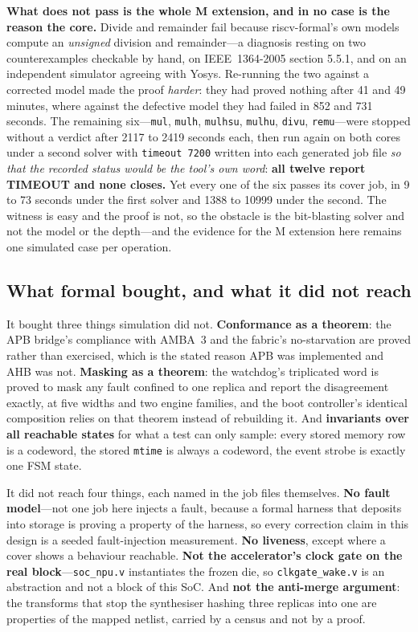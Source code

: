 \documentclass[11pt,a4paper]{article}
\newcommand{\file}[1]{\texttt{\small #1}}
\begin{document}
\textbf{What does not pass is the whole M extension, and in no case is
the reason the core.} Divide and remainder fail because riscv-formal's
own models compute an \emph{unsigned} division and remainder---a
diagnosis resting on two counterexamples checkable by hand, on
IEEE~1364-2005 section 5.5.1, and on an independent simulator agreeing
with Yosys. Re-running the two against a corrected model made the proof
\emph{harder}: they had proved nothing after \num{41} and \num{49}
minutes, where against the defective model they had failed in \num{852}
and \num{731} seconds. The remaining six---\texttt{mul},
\texttt{mulh}, \texttt{mulhsu}, \texttt{mulhu}, \texttt{divu},
\texttt{remu}---were stopped without a verdict after \num{2117} to
\num{2419} seconds each, then run again on both cores under a second
solver with \texttt{timeout 7200} written into each generated job file
\emph{so that the recorded status would be the tool's own word}:
\textbf{all twelve report TIMEOUT and none closes.} Yet every one of
the six passes its cover job, in \num{9} to \num{73} seconds under the
first solver and \num{1388} to \num{10999} under the second. The
witness is easy and the proof is not, so the obstacle is the
bit-blasting solver and not the model or the depth---and the evidence
for the M extension here remains one simulated case per operation.

\subsection{What formal bought, and what it did not reach}

It bought three things simulation did not. \textbf{Conformance as a
theorem}: the APB bridge's compliance with AMBA~3 and the fabric's
no-starvation are proved rather than exercised, which is the stated
reason APB was implemented and AHB was not. \textbf{Masking as a
theorem}: the watchdog's triplicated word is proved to mask any fault
confined to one replica and report the disagreement exactly, at five
widths and two engine families, and the boot controller's identical
composition relies on that theorem instead of rebuilding it. And
\textbf{invariants over all reachable states} for what a test can only
sample: every stored memory row is a codeword, the stored
\texttt{mtime} is always a codeword, the event strobe is exactly one
FSM state.

It did not reach four things, each named in the job files themselves.
\textbf{No fault model}---not one job here injects a fault, because a
formal harness that deposits into storage is proving a property of the
harness, so every correction claim in this design is a seeded
fault-injection measurement. \textbf{No liveness}, except where a cover
shows a behaviour reachable. \textbf{Not the accelerator's clock gate on
the real block}---\file{soc\_npu.v} instantiates the frozen die, so
\file{clkgate\_wake.v} is an abstraction and not a block of this SoC.
And
\textbf{not the anti-merge argument}: the transforms that stop the
synthesiser hashing three replicas into one are properties of the
mapped netlist, carried by a census and not by a proof.
\end{document}

